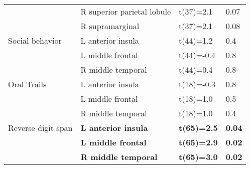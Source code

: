 \documentclass[]{article}
\begin{document}
\begin{table}[ht]
\begin{tabular}{llll}
   & R superior parietal lobule & t(37)=2.1 & 0.07 \\ 
   & R supramarginal & t(37)=2.1 & 0.08 \\ 
  Social behavior & L anterior insula & t(44)=1.2 & 0.4 \\ 
   & L middle frontal & t(44)=-0.4 & 0.8 \\ 
   & R middle temporal & t(44)=0.4 & 0.8 \\ 
  Oral Trails & L anterior insula & t(18)=-0.3 & 0.8 \\ 
   & L middle frontal & t(18)=1.0 & 0.5 \\ 
   & R middle temporal & t(18)=1.0 & 0.4 \\ 
  Reverse digit span & \textbf{L anterior insula} & \textbf{t(65)=2.5} & \textbf{0.04} \\ 
   & \textbf{L middle frontal} & \textbf{t(65)=2.9} & \textbf{0.02} \\ 
   & \textbf{R middle temporal} & \textbf{t(65)=3.0} & \textbf{0.02} \\ 
   \hline
\end{tabular}
\end{table}
\end{document}
